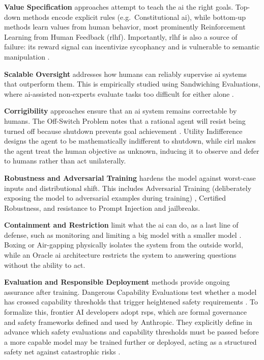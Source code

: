 	\textbf{Value Specification} approaches attempt to teach the \gls{ai} the right goals. Top-down methods encode explicit rules (e.g.\ Constitutional \gls{ai}), while bottom-up methods learn values from human behavior, most prominently Reinforcement Learning from Human Feedback (\gls{rlhf}). Importantly, \gls{rlhf} is also a source of failure: its reward signal can incentivize sycophancy \cite{sharma2024sycophancy} and is vulnerable to semantic manipulation \cite{mcintosh_inadequacy_2024}.

	\textbf{Scalable Oversight} addresses how humans can reliably supervise \gls{ai} systems that outperform them. This is empirically studied using Sandwiching Evaluations, where \gls{ai}-assisted non-experts evaluate tasks too difficult for either alone \cite{bowman2022measuring}. %

	\textbf{Corrigibility} approaches ensure that an \gls{ai} system remains correctable by humans. The Off-Switch Problem notes that a rational agent will resist being turned off because shutdown prevents goal achievement \cite{bostrom2012superintelligent}. Utility Indifference designs the agent to be mathematically indifferent to shutdown, while \gls{cirl} makes the agent treat the human objective as unknown, inducing it to observe and defer to humans rather than act unilaterally.

	\textbf{Robustness and Adversarial Training} hardens the model against worst-case inputs and distributional shift. This includes Adversarial Training (deliberately exposing the model to adversarial examples during training) \cite{goodfellow2015explaining}, Certified Robustness, and resistance to Prompt Injection and jailbreaks.

	\textbf{Containment and Restriction} limit what the \gls{ai} can do, as a last line of defense, such as monitoring and limiting a big model with a smaller model \cite{greenblatt2023aicontrol}. Boxing or Air-gapping physically isolates the system from the outside world, while an Oracle \gls{ai} architecture restricts the system to answering questions without the ability to act.

	\textbf{Evaluation and Responsible Deployment} methods provide ongoing assurance after training. Dangerous Capability Evaluations test whether a model has crossed capability thresholds that trigger heightened safety requirements \cite{FLIAISafetyIndex2025, FLIAISafetyIndex2026, AISafetyReport2025}. To formalize this, frontier AI developers adopt \glspl{rsp}, which are formal governance and safety frameworks defined and used by Anthropic. They explicitly define in advance which safety evaluations and capability thresholds must be passed before a more capable model may be trained further or deployed, acting as a structured safety net against catastrophic risks \cite{anthropic2026rsp}.

